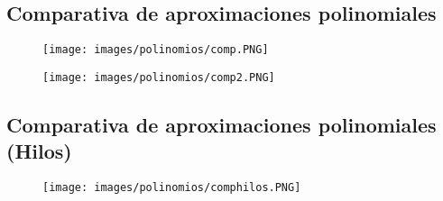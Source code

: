 \documentclass[12pt]{article}
\begin{document}
			\subsection{Comparativa de aproximaciones polinomiales}
			\begin{figure}[H]
			    	   \centering
			    	   \texttt{[image: images/polinomios/comp.PNG]}
			    \end{figure}
			    
			    \begin{figure}[H]
			    	   \centering
			    	   \texttt{[image: images/polinomios/comp2.PNG]}
			    \end{figure}
			
			\subsection{Comparativa de aproximaciones polinomiales (Hilos)}
			\begin{figure}[H]
			    	   \centering
			    	   \texttt{[image: images/polinomios/comphilos.PNG]}
			    \end{figure}
			
\newpage

\end{document}
